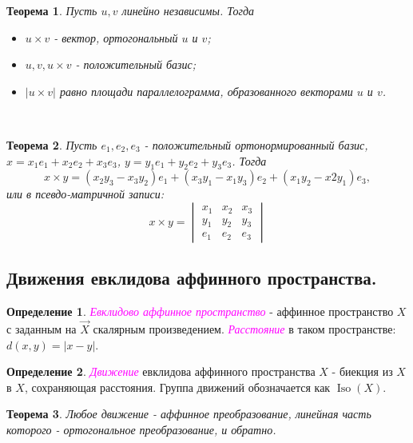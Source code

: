 \documentclass[a4paper,100pt]{article}
\theoremstyle{indented}
\newtheorem{theorem}{Теорема}
\theoremstyle{definition}
\newtheorem{defn}{Определение}
\theoremstyle{remark}
\DeclareMathOperator{\Iso}{Iso}
\begin{document}
\begin{theorem}
    Пусть $u, v$ линейно независимы. Тогда 
    
    \begin{itemize}
        \item $u\times v$ - вектор, ортогональный $u$ и $v$; 
        \item $u, v, u\times v$ - положительный базис; 
        \item $|u\times v|$ равно площади параллелограмма, образованного векторами $u$ и $v$. 
    \end{itemize}
\end{theorem} \ 

\begin{theorem}
    Пусть $e_1, e_2, e_3$ - положительный ортонормированный базис, $x=x_1e_1+x_2e_2+x_3e_3$, $y=y_1e_1+y_2e_2+y_3e_3$. Тогда 
    \[
        x\times y = (x_2y_3-x_3y_2)e_1+(x_3y_1-x_1y_3)e_2+(x_1y_2-x2y_1)e_3, 
    \]
    или в псевдо-матричной записи:
    \begin{equation*}
        x\times y = 
        \begin{vmatrix}
            x_1 & x_2 & x_3 \\
            y_1 & y_2 & y_3 \\
            e_1 & e_2 & e_3 
        \end{vmatrix}
    \end{equation*}
\end{theorem}

\subsection{Движения евклидова аффинного пространства.}

\begin{defn}
    \textit{\textcolor{magenta}{\hypertarget{s84}{Евклидово аффинное пространство}}} - аффинное пространство $X$ с заданным на $\vec{X}$ скалярным произведением. \textit{\textcolor{magenta}{\hypertarget{s85}{Расстояние}}} в таком пространстве: $d(x, y)=|x-y|$. 
\end{defn}

\begin{defn}
    \textit{\textcolor{magenta}{\hypertarget{s86}{Движение}}} евклидова аффинного пространства $X$ - биекция из $X$ в $X$, сохраняющая расстояния. Группа движений обозначается как $\Iso(X)$.
\end{defn}

\begin{theorem}
    Любое движение - аффинное преобразование, линейная часть которого - ортогональное преобразование, и обратно.
\end{theorem} \
\end{document}
